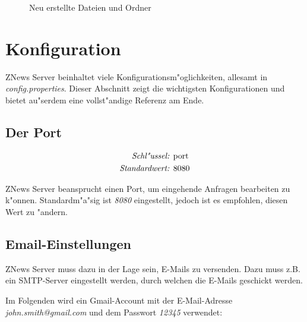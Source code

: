     \begin{figure}[htb]
        \caption{\label{fig:dirtree2}Neu erstellte Dateien und Ordner}
    \end{figure}

    \pagebreak
    \section{Konfiguration}%
    \label{sec:config}

    ZNews Server beinhaltet viele Konfigurationsm"oglichkeiten,
    allesamt in \emph{config.properties}.
    Dieser Abschnitt zeigt die wichtigsten Konfigurationen
    und bietet au"serdem eine vollst"andige Referenz am Ende.

    \subsection{Der Port}

    \begin{align*}
        \emph{Schl"ussel: } & \lstinline{port}\\
        \emph{Standardwert: } & \lstinline{8080}
    \end{align*}

    ZNews Server beansprucht einen Port, um eingehende
    Anfragen bearbeiten zu k"onnen. Standardm"a"sig ist
    \emph{8080} eingestellt, jedoch ist es empfohlen,
    diesen Wert zu "andern.

    \subsection{Email-Einstellungen}

    ZNews Server muss dazu in der Lage sein, E-Mails
    zu versenden. Dazu muss z.B. ein SMTP-Server eingestellt
    werden, durch welchen die E-Mails geschickt werden.

    Im Folgenden wird ein Gmail-Account mit der
    E-Mail-Adresse \emph{john.smith@gmail.com} und
    dem Passwort \emph{12345} verwendet:

